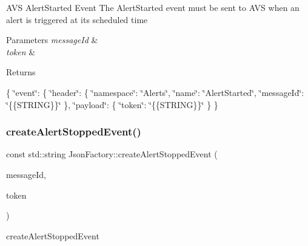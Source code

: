 A\+VS Alert\+Started Event The Alert\+Started event must be sent to A\+VS when an alert is triggered at its scheduled time 
\begin{DoxyParams}{Parameters}
{\em message\+Id} & \\
\hline
{\em token} & \\
\hline
\end{DoxyParams}
\begin{DoxyReturn}{Returns}

\end{DoxyReturn}
\{ \char`\"{}event\char`\"{}\+: \{ \char`\"{}header\char`\"{}\+: \{ \char`\"{}namespace\char`\"{}\+: \char`\"{}\+Alerts\char`\"{}, \char`\"{}name\char`\"{}\+: \char`\"{}\+Alert\+Started\char`\"{}, \char`\"{}message\+Id\char`\"{}\+: \char`\"{}\{\{\+S\+T\+R\+I\+N\+G\}\}\char`\"{} \}, \char`\"{}payload\char`\"{}\+: \{ \char`\"{}token\char`\"{}\+: \char`\"{}\{\{\+S\+T\+R\+I\+N\+G\}\}\char`\"{} \} \} \mbox{\label{classAVSJson_1_1JsonFactory_a86e0cf9125314d467eda43686b5916f6}} 
\subsubsection{\texorpdfstring{create\+Alert\+Stopped\+Event()}{createAlertStoppedEvent()}}
{\footnotesize\ttfamily const std\+::string Json\+Factory\+::create\+Alert\+Stopped\+Event (\begin{DoxyParamCaption}\item[{const std\+::string \&}]{message\+Id,  }\item[{const std\+::string \&}]{token }\end{DoxyParamCaption})}



create\+Alert\+Stopped\+Event 

